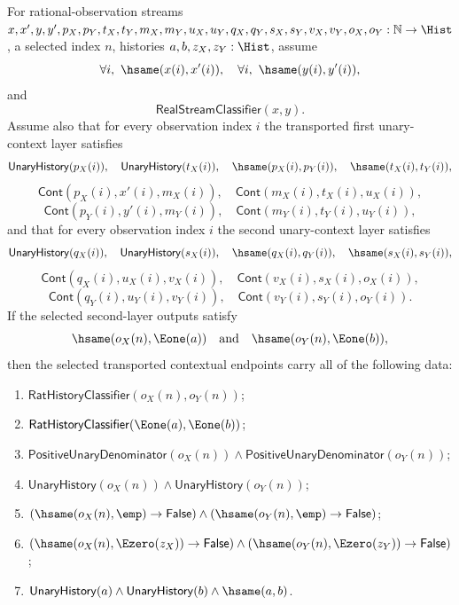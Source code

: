 \begin{theorem}
\label{thm:real-stream-classifier-transported-iterated-unary-context-selected-classifier-full-endpoint-package}
For rational-observation streams
$x,x',y,y',p_X,p_Y,t_X,t_Y,m_X,m_Y,u_X,u_Y,q_X,q_Y,s_X,s_Y,v_X,v_Y,o_X,o_Y:
\mathbb{N}\to\Hist$, a selected index $n$, histories
$a,b,z_X,z_Y:\Hist$, assume
$$
\forall i,\ \hsame(x(i),x'(i)),\quad
\forall i,\ \hsame(y(i),y'(i)),
$$
and
$$
\mathsf{RealStreamClassifier}(x,y).
$$
Assume also that for every observation index $i$ the transported first
unary-context layer satisfies
$$
\mathsf{UnaryHistory}(p_X(i)),\quad \mathsf{UnaryHistory}(t_X(i)),\quad
\hsame(p_X(i),p_Y(i)),\quad \hsame(t_X(i),t_Y(i)),
$$
$$
\mathsf{Cont}(p_X(i),x'(i),m_X(i)),\quad
\mathsf{Cont}(m_X(i),t_X(i),u_X(i)),
$$
$$
\mathsf{Cont}(p_Y(i),y'(i),m_Y(i)),\quad
\mathsf{Cont}(m_Y(i),t_Y(i),u_Y(i)),
$$
and that for every observation index $i$ the second unary-context layer
satisfies
$$
\mathsf{UnaryHistory}(q_X(i)),\quad \mathsf{UnaryHistory}(s_X(i)),\quad
\hsame(q_X(i),q_Y(i)),\quad \hsame(s_X(i),s_Y(i)),
$$
$$
\mathsf{Cont}(q_X(i),u_X(i),v_X(i)),\quad
\mathsf{Cont}(v_X(i),s_X(i),o_X(i)),
$$
$$
\mathsf{Cont}(q_Y(i),u_Y(i),v_Y(i)),\quad
\mathsf{Cont}(v_Y(i),s_Y(i),o_Y(i)).
$$
If the selected second-layer outputs satisfy
$$
\hsame(o_X(n),\Eone(a))\quad\text{and}\quad
\hsame(o_Y(n),\Eone(b)),
$$
then the selected transported contextual endpoints carry all of the following
data:
\begin{enumerate}
\item $\mathsf{RatHistoryClassifier}(o_X(n),o_Y(n))$;
\item $\mathsf{RatHistoryClassifier}(\Eone(a),\Eone(b))$;
\item $\mathsf{PositiveUnaryDenominator}(o_X(n))\land
\mathsf{PositiveUnaryDenominator}(o_Y(n))$;
\item $\mathsf{UnaryHistory}(o_X(n))\land \mathsf{UnaryHistory}(o_Y(n))$;
\item $(\hsame(o_X(n),\emp)\to\mathsf{False})\land
(\hsame(o_Y(n),\emp)\to\mathsf{False})$;
\item $(\hsame(o_X(n),\Ezero(z_X))\to\mathsf{False})\land
(\hsame(o_Y(n),\Ezero(z_Y))\to\mathsf{False})$;
\item $\mathsf{UnaryHistory}(a)\land\mathsf{UnaryHistory}(b)\land
\hsame(a,b)$.
\end{enumerate}
\end{theorem}
